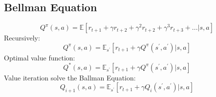 \subsection{Bellman Equation}
\label{ssect:bellman-equation}
\[
Q^{\pi}(s, a) = \mathbb{E}[r_{t + 1} + \gamma r_{t + 2} + \gamma^2 r_{t + 2} + \gamma^3 r_{t + 3} + ... | s, a]
\]
Recursively:
\[
Q^{\pi}(s, a) = \mathbb{E}_{s^{'}}[r_{t + 1} + \gamma Q^{\pi}(s^{'}, a^{'})| s, a]
\]
Optimal value function:
\[
Q^{*}(s, a) = \mathbb{E}_{s^{'}}[r_{t + 1} + \gamma Q^{\pi}(s^{'}, a^{'})| s, a]
\]
Value iteration solve the Ballman Equation:
\[
Q_{i + 1}(s, a) = \mathbb{E}_{s^{'}}[r_{t + 1} + \gamma Q_i(s^{'}, a^{'})| s, a]
\]


\newpage